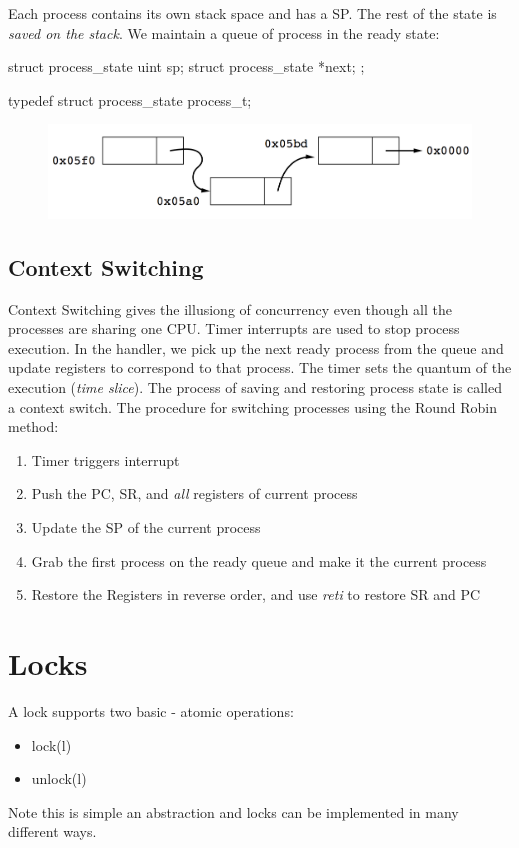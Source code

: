 \documentclass{hw}
\begin{document}
Each process contains its own stack space and has a SP. The rest of the state is
\emph{saved on the stack}. We maintain a queue of process in the ready state:
\begin{C}
struct process_state {
  uint sp;
  struct process_state *next;
};

typedef struct process_state process_t;
\end{C}

\begin{figure}[H]
  \centering
  \includegraphics[scale=.4]{img/queue}
\end{figure}

\subsection{Context Switching}
Context Switching gives the illusiong of concurrency even though
all the processes are sharing one CPU.
Timer interrupts are used to stop process execution. In the handler, we pick up
the next ready process from the queue and update registers to correspond to that
process. The timer sets the quantum of the execution (\emph{time slice}). The
process of saving and restoring process state is called a context switch.
The procedure for switching processes using the Round Robin method:

\begin{enumerate}
  \item Timer triggers interrupt
  \item Push the PC, SR, and \emph{all} registers of current process
  \item Update the SP of the current process 
  \item Grab the first process on the ready queue and make it the current process
  \item Restore the Registers in reverse order, and use \emph{reti} to restore
    SR and PC
\end{enumerate}


\section{Locks}
A lock supports two basic - atomic operations:
\begin{itemize}
  \item lock(l)
  \item unlock(l)
\end{itemize}
Note this is simple an abstraction and locks can be implemented in many 
different ways.
\end{document}

